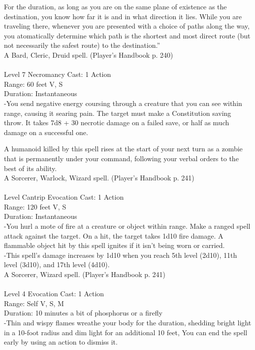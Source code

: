 \documentclass[10pt,twocolumn]{report}
\begin{document}
For the duration, as long as you are on the same plane of existence as the destination, you know how far it is and in what direction it lies. While you are traveling there, whenever you are presented with a choice of paths along the way, you atomatically determine which path is the shortest and most direct route (but not necessarily the safest route) to the destination.”\\
A Bard, Cleric, Druid spell. (Player's Handbook p. 240) \\


 \\
Level 7 \quad Necromancy \quad Cast: 1 Action\\
Range: 60 feet \quad V, S\\
Duration: Instantaneous \quad \\
-You send negative energy coursing through a creature that you can see within range, causing it searing pain.
The target must make a Constitution saving throw. It takes 7d8 + 30 necrotic damage on a failed save, or half as much damage on a successful one.

A humanoid killed by this spell rises at the start of your next turn as a zombie that is permanently under your command, following your verbal orders to the best of its ability.\\
A Sorcerer, Warlock, Wizard spell. (Player's Handbook p. 241) \\


 \\
Level Cantrip \quad Evocation \quad Cast: 1 Action\\
Range: 120 feet \quad V, S\\
Duration: Instantaneous \quad \\
-You hurl a mote of fire at a creature or object within range. Make a ranged spell attack against the target. On a hit, the target takes 1d10 fire damage. A flammable object hit by this spell ignites if it isn’t being worn or carried.\\
-This spell’s damage increases by 1d10 when you reach 5th level (2d10), 11th level (3d10), and 17th level (4d10).\\
A Sorcerer, Wizard spell. (Player's Handbook p. 241) \\


 \\
Level 4 \quad Evocation \quad Cast: 1 Action\\
Range: Self \quad V, S, M\\
Duration: 10 minutes \quad a bit of phosphorus or a firefly\\
-Thin and wispy flames wreathe your body for the duration, shedding bright light in a 10-foot radius and dim light for an additional 10 feet, You can end the spell early by using an action to dismiss it.
\end{document}
